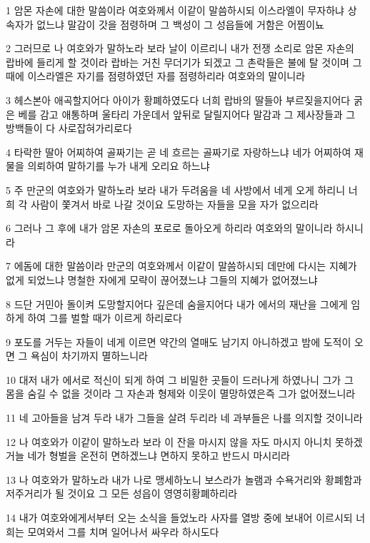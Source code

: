 \par 1 암몬 자손에 대한 말씀이라 여호와께서 이같이 말씀하시되 이스라엘이 무자하냐 상속자가 없느냐 말감이 갓을 점령하며 그 백성이 그 성읍들에 거함은 어찜이뇨
\par 2 그러므로 나 여호와가 말하노라 보라 날이 이르리니 내가 전쟁 소리로 암몬 자손의 랍바에 들리게 할 것이라 랍바는 거친 무더기가 되겠고 그 촌락들은 불에 탈 것이며 그때에 이스라엘은 자기를 점령하였던 자를 점령하리라 여호와의 말이니라
\par 3 헤스본아 애곡할지어다 아이가 황폐하였도다 너희 랍바의 딸들아 부르짖을지어다 굵은 베를 감고 애통하며 울타리 가운데서 앞뒤로 달릴지어다 말감과 그 제사장들과 그 방백들이 다 사로잡혀가리로다
\par 4 타락한 딸아 어찌하여 골짜기는 곧 네 흐르는 골짜기로 자랑하느냐 네가 어찌하여 재물을 의뢰하여 말하기를 누가 내게 오리요 하느냐
\par 5 주 만군의 여호와가 말하노라 보라 내가 두려움을 네 사방에서 네게 오게 하리니 너희 각 사람이 쫓겨서 바로 나갈 것이요 도망하는 자들을 모을 자가 없으리라
\par 6 그러나 그 후에 내가 암몬 자손의 포로로 돌아오게 하리라 여호와의 말이니라 하시니라
\par 7 에돔에 대한 말씀이라 만군의 여호와께서 이같이 말씀하시되 데만에 다시는 지혜가 없게 되었느냐 명철한 자에게 모략이 끊어졌느냐 그들의 지혜가 없어졌느냐
\par 8 드단 거민아 돌이켜 도망할지어다 깊은데 숨을지어다 내가 에서의 재난을 그에게 임하게 하여 그를 벌할 때가 이르게 하리로다
\par 9 포도를 거두는 자들이 네게 이르면 약간의 열매도 남기지 아니하겠고 밤에 도적이 오면 그 욕심이 차기까지 멸하느니라
\par 10 대저 내가 에서로 적신이 되게 하여 그 비밀한 곳들이 드러나게 하였나니 그가 그 몸을 숨길 수 없을 것이라 그 자손과 형제와 이웃이 멸망하였은즉 그가 없어졌느니라
\par 11 네 고아들을 남겨 두라 내가 그들을 살려 두리라 네 과부들은 나를 의지할 것이니라
\par 12 나 여호와가 이같이 말하노라 보라 이 잔을 마시지 않을 자도 마시지 아니치 못하겠거늘 네가 형벌을 온전히 면하겠느냐 면하지 못하고 반드시 마시리라
\par 13 나 여호와가 말하노라 내가 나로 맹세하노니 보스라가 놀램과 수욕거리와 황폐함과 저주거리가 될 것이요 그 모든 성읍이 영영히황폐하리라
\par 14 내가 여호와에게서부터 오는 소식을 들었노라 사자를 열방 중에 보내어 이르시되 너희는 모여와서 그를 치며 일어나서 싸우라 하시도다
